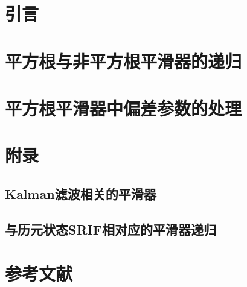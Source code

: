 \documentclass[./book.tex]{subfiles}
\begin{document}
\section{引言}

\section{平方根与非平方根平滑器的递归}

\section{平方根平滑器中偏差参数的处理}

\section{附录}

\subsection{Kalman滤波相关的平滑器}

\subsection{与历元状态SRIF相对应的平滑器递归}

\section{参考文献}
\end{document}
